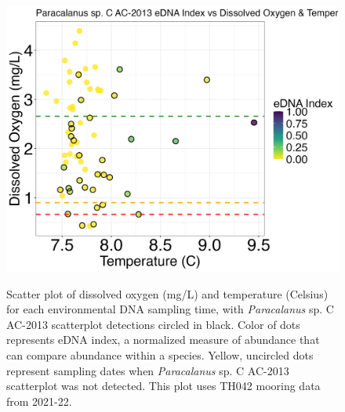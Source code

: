\documentclass[12pt,twoside]{reedthesis}
\begin{document}
		\begin{figure}[!h]
		\begin{center}
			\includegraphics[scale=0.3]{Paracalanus_Scatter_noOut} \\
			\caption[\textit{Paracalanus} sp. C AC-2013 scatterplot]{\footnotesize{Scatter plot of dissolved oxygen (mg/L) and temperature (Celsius) for each environmental DNA sampling time, with \textit{Paracalanus} sp. C AC-2013 scatterplot detections circled in black. Color of dots represents eDNA index, a normalized measure of abundance that can compare abundance within a species. Yellow, uncircled dots represent sampling dates when \textit{Paracalanus} sp. C AC-2013 scatterplot was not detected. This plot uses TH042 mooring data from 2021-22.}} %
			\label{ParacalanusScatterApp}
		\end{center}
	\end{figure} 
	
\end{document}
